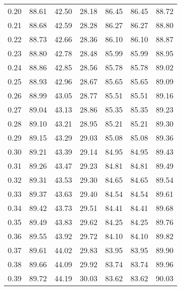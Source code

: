 \begin{tabular}{|c|c|c|c|c|c|c|}
      0.20 &     88.61 &     42.50 &      28.18 &   86.45 &      86.45 &         88.72 \\
      0.21 &     88.68 &     42.59 &      28.28 &   86.27 &      86.27 &         88.80 \\
      0.22 &     88.73 &     42.66 &      28.36 &   86.10 &      86.10 &         88.87 \\
      0.23 &     88.80 &     42.78 &      28.48 &   85.99 &      85.99 &         88.95 \\
      0.24 &     88.86 &     42.85 &      28.56 &   85.78 &      85.78 &         89.02 \\
      0.25 &     88.93 &     42.96 &      28.67 &   85.65 &      85.65 &         89.09 \\
      0.26 &     88.99 &     43.05 &      28.77 &   85.51 &      85.51 &         89.16 \\
      0.27 &     89.04 &     43.13 &      28.86 &   85.35 &      85.35 &         89.23 \\
      0.28 &     89.10 &     43.21 &      28.95 &   85.21 &      85.21 &         89.30 \\
      0.29 &     89.15 &     43.29 &      29.03 &   85.08 &      85.08 &         89.36 \\
      0.30 &     89.21 &     43.39 &      29.14 &   84.95 &      84.95 &         89.43 \\
      0.31 &     89.26 &     43.47 &      29.23 &   84.81 &      84.81 &         89.49 \\
      0.32 &     89.31 &     43.53 &      29.30 &   84.65 &      84.65 &         89.54 \\
      0.33 &     89.37 &     43.63 &      29.40 &   84.54 &      84.54 &         89.61 \\
      0.34 &     89.42 &     43.73 &      29.51 &   84.41 &      84.41 &         89.68 \\
      0.35 &     89.49 &     43.83 &      29.62 &   84.25 &      84.25 &         89.76 \\
      0.36 &     89.55 &     43.92 &      29.72 &   84.10 &      84.10 &         89.82 \\
      0.37 &     89.61 &     44.02 &      29.83 &   83.95 &      83.95 &         89.90 \\
      0.38 &     89.66 &     44.09 &      29.92 &   83.74 &      83.74 &         89.96 \\
      0.39 &     89.72 &     44.19 &      30.03 &   83.62 &      83.62 &         90.03 \\

\end{tabular}
